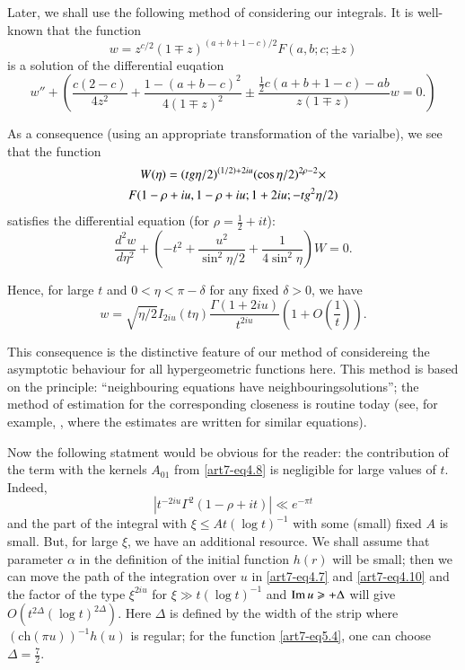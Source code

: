 Later, we shall use the following method of considering our integrals. It is well-known that the function
$$
w = z^{c/2} (1 \mp z)^{(a+ b + 1 - c)/2} F (a, b; c; \pm z)
$$
is a solution of the differential euqation 
\begin{equation}
w'' + \left(\frac{c(2-c)}{4z^2} + \frac{1-(a+b-c)^2}{4(1\mp z)^2} \pm \frac{\frac{1}{2}c (a+ b + 1 - c) - ab}{z(1 \mp z)} w = 0. \right)\label{art7-eq6.3} 
\end{equation}

As a consequence (using an appropriate transformation of the varialbe), we see that the function 
\begin{gather}
W(\eta) = (tg \eta/2)^{(1/2) + 2 iu} (\cos \eta/ 2)^{2 \rho -2 } \times \label{art7-eq6.4}\\
F (1- \rho + iu, 1 - \rho + iu; 1 + 2 iu; - tg^2 \eta/2) \notag
\end{gather}
satisfies the differential equation (for $\rho = \frac{1}{2} + it$):
\begin{equation}
\frac{d^2w}{d\eta^2} + \left(-t^2 + \frac{u^2}{\sin^2 \eta/2} + \frac{1}{4 \sin^2 \eta}\right) W = 0. \label{art7-eq6.5}
\end{equation}

Hence, for large $t$ and $0< \eta < \pi - \delta$ for any fixed $\delta>0$, we have 
\begin{equation}
w = \sqrt{\eta/ 2} I_{2 i u} (t \eta) \frac{\Gamma (1+ 2 iu )}{t^{2 i u}} (1+ O(\frac{1}{t})). \label{art7-eq6.6}
\end{equation}

This consequence is the distinctive feature of our method of considereing the asymptotic behaviour for all hypergeometric functions here. This method is based on the principle: ``neighbouring equations have neighbouring\pageoriginale solutions''; the method of estimation for the corresponding closeness is routine today (see, for example, \cite{art7-key5}, where the estimates are written for similar equations).

Now the following statment would be obvious for the reader: the contribution of the term with the kernels $A_{01}$ from \eqref{art7-eq4.8} is negligible for large values of $t$. Indeed,
$$
|t^{-2iu} \Gamma^2 (1- \rho + it)| \ll e^{-\pi t}
$$
and the part of the integral with $\xi \leqslant A t(\log t)^{-1}$ with some (small) fixed $A$ is small. But, for large $\xi$, we have an additional resource.  We shall assume that parameter $\alpha$ in the definition of the initial function $h(r)$ will be small; then we can move the path of the integration over $u$ in \eqref{art7-eq4.7}  and \eqref{art7-eq4.10} and the factor of the type $\xi^{2i u}$ for $\xi \gg t (\log t)^{-1}$ and $\operatorname{Im} u \geqslant  + \Delta$ will give $O(t^{2\Delta} (\log t)^{2\Delta})$. Here $\Delta$ is defined by the width of the strip where $(\text{ch}(\pi u))^{-1} h(u)$ is regular; for the function \eqref{art7-eq5.4}, one can choose $\Delta = \frac{7}{2}$. 

